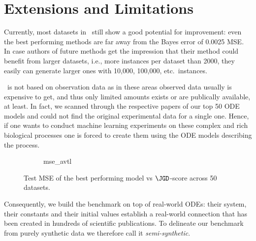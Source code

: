 
\normalsize
\section{Extensions and Limitations}\label{sec:limit}
Currently, most datasets in \Bench~still show a good potential for improvement:
even the best performing methods are far away from the Bayes error of
0.0025 MSE\@.
In case authors of future methods get the impression that their method
could benefit from larger datasets, i.e., more instances per dataset than 2000,
they easily can generate larger ones with 10,000, 100,000, etc.\ instances.

\Bench~is not based on observation data as in these areas
observed data usually is expensive to get, and thus only limited
amounts exists or are publically available, at least.
In fact, we scanned through the respective papers of our top 50 ODE models 
and could not find the original experimental data for a single one. 
Hence, if one wants to conduct machine learning experiments on these complex
and rich biological processes one is forced to create them using the ODE models describing the process.
\begin{wrapfigure}{r}{0.45\textwidth}
	\centering
	\begin{subfigure}{\linewidth}
		\centering
	{mse_avtl}
	\end{subfigure}
	\caption{Test MSE of the best performing model vs $\JGD$-score across 50 datasets.}\label{fig:mse_jgd}
	\vspace{-\baselineskip}
\end{wrapfigure}

Consequently, we build the benchmark on top of real-world ODEs:
their system, their constants and their initial values establish
a real-world connection that has been created in hundreds
of scientific publications. To delineate our benchmark from purely
synthetic data we therefore call it \emph{semi-synthetic}.

